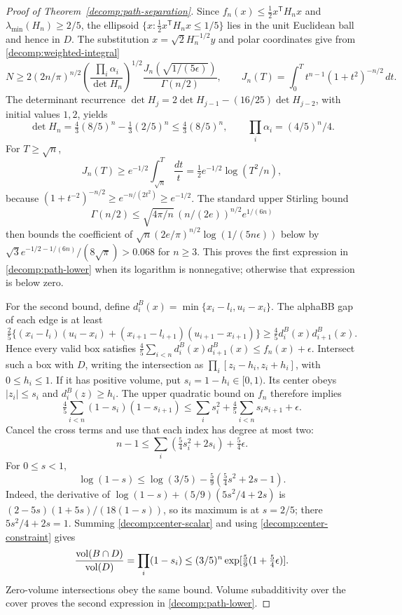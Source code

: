 \begin{proof}[Proof of Theorem~\ref{decomp:path-separation}]
Since $f_n(x)\le\tfrac12x^{\mathsf T}H_nx$ and
$\lambda_{\min}(H_n)\ge2/5$, the ellipsoid
$\{x:\tfrac12x^{\mathsf T}H_nx\le1/5\}$ lies in the unit Euclidean ball
and hence in $D$. The substitution $x=\sqrt2H_n^{-1/2}y$ and polar
coordinates give from \eqref{decomp:weighted-integral}
\begin{equation}\label{decomp:path-exact-integral}
 N\ge2(2n/\pi)^{n/2}
       \left(\frac{\prod_i\alpha_i}{\det H_n}\right)^{1/2}
       \frac{J_n(\sqrt{1/(5\epsilon)})}{\Gamma(n/2)},
 \qquad
 J_n(T)=\int_0^Tt^{n-1}(1+t^2)^{-n/2}\,dt.
\end{equation}
The determinant recurrence
$\det H_j=2\det H_{j-1}-(16/25)\det H_{j-2}$, with initial values
$1,2$, yields
\[
 \det H_n=\tfrac43(8/5)^n-\tfrac13(2/5)^n
       \le\tfrac43(8/5)^n,
 \qquad \prod_i\alpha_i=(4/5)^n/4.
\]
For $T\ge\sqrt n$,
\[
 J_n(T)\ge e^{-1/2}\int_{\sqrt n}^T\frac{dt}{t}
         =\tfrac12e^{-1/2}\log(T^2/n),
\]
because $(1+t^{-2})^{-n/2}\ge e^{-n/(2t^2)}\ge e^{-1/2}$.
The standard upper Stirling bound
\[
 \Gamma(n/2)\le\sqrt{4\pi/n}\,(n/(2e))^{n/2}e^{1/(6n)}
\]
then bounds the coefficient of
$\sqrt n(2e/\pi)^{n/2}\log(1/(5n\epsilon))$ below by
$\sqrt3e^{-1/2-1/(6n)}/(8\sqrt\pi)>0.068$ for $n\ge3$.
This proves the first expression in \eqref{decomp:path-lower} when its
logarithm is nonnegative; otherwise that expression is below zero.

For the second bound, define
$d_i^B(x)=\min\{x_i-l_i,u_i-x_i\}$.
The alphaBB gap of each edge is at least
\[
 \tfrac25\{(x_i-l_i)(u_i-x_i)+(x_{i+1}-l_{i+1})(u_{i+1}-x_{i+1})\}
 \ge\tfrac45 d_i^B(x)d_{i+1}^B(x).
\]
Hence every valid box satisfies
$\tfrac45\sum_{i<n}d_i^B(x)d_{i+1}^B(x)\le f_n(x)+\epsilon$.
Intersect such a box with $D$, writing the intersection as
$\prod_i[z_i-h_i,z_i+h_i]$, with $0\le h_i\le1$.
If it has positive volume, put $s_i=1-h_i\in[0,1)$.
Its center obeys $|z_i|\le s_i$ and $d_i^B(z)\ge h_i$.
The upper quadratic bound on $f_n$ therefore implies
\[
 \tfrac45\sum_{i<n}(1-s_i)(1-s_{i+1})
 \le\sum_i s_i^2+\tfrac45\sum_{i<n}s_is_{i+1}+\epsilon.
\]
Cancel the cross terms and use that each index has degree at most two:
\begin{equation}\label{decomp:center-constraint}
 n-1\le\sum_i(\tfrac54s_i^2+2s_i)+\tfrac54\epsilon.
\end{equation}
For $0\le s<1$,
\begin{equation}\label{decomp:center-scalar}
 \log(1-s)\le\log(3/5)
          -\tfrac59(\tfrac54s^2+2s-1).
\end{equation}
Indeed, the derivative of
$\log(1-s)+(5/9)(5s^2/4+2s)$ is
$(2-5s)(1+5s)/(18(1-s))$, so its maximum is at $s=2/5$;
there $5s^2/4+2s=1$. Summing
\eqref{decomp:center-scalar} and using
\eqref{decomp:center-constraint} gives
\[
 \frac{\operatorname{vol}(B\cap D)}{\operatorname{vol}(D)}=\prod_i(1-s_i)
 \le(3/5)^n\exp[\tfrac59(1+\tfrac54\epsilon)].
\]
Zero-volume intersections obey the same bound. Volume subadditivity over
the cover proves the second expression in \eqref{decomp:path-lower}.


\end{proof}
